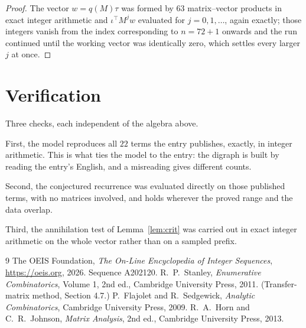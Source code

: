 \documentclass[11pt,a4paper]{article}
\theoremstyle{plain}
\theoremstyle{definition}
\begin{document}
\begin{proof}
The vector $w=q(M)\tau$ was formed by $63$ matrix--vector products in exact integer
arithmetic and $\iota^{\!\top}M^{j}w$ evaluated for $j=0,1,\dots$, again exactly; those
integers vanish from the index corresponding to $n=72+1$ onwards and the run continued
until the working vector was identically zero, which settles every larger $j$ at once.
\end{proof}

\section{Verification}

Three checks, each independent of the algebra above.

First, the model reproduces all $22$ terms the entry publishes, exactly, in integer
arithmetic. This is what ties the model to the entry: the digraph is built by reading the
entry's English, and a misreading gives different counts.

Second, the conjectured recurrence was evaluated directly on those published terms, with no
matrices involved, and holds wherever the proved range and the data overlap.

Third, the annihilation test of Lemma~\ref{lem:crit} was carried out in exact integer
arithmetic on the whole vector rather than on a sampled prefix.

\begin{thebibliography}{9}
 The OEIS Foundation, \emph{The On-Line Encyclopedia of Integer
Sequences}, \url{https://oeis.org}, 2026. Sequence A202120.
 R.~P.~Stanley, \emph{Enumerative Combinatorics}, Volume 1, 2nd ed.,
Cambridge University Press, 2011. (Transfer-matrix method, Section 4.7.)
 P.~Flajolet and R.~Sedgewick, \emph{Analytic Combinatorics}, Cambridge
University Press, 2009.
 R.~A.~Horn and C.~R.~Johnson, \emph{Matrix Analysis}, 2nd ed., Cambridge
University Press, 2013.
\end{thebibliography}
\end{document}
